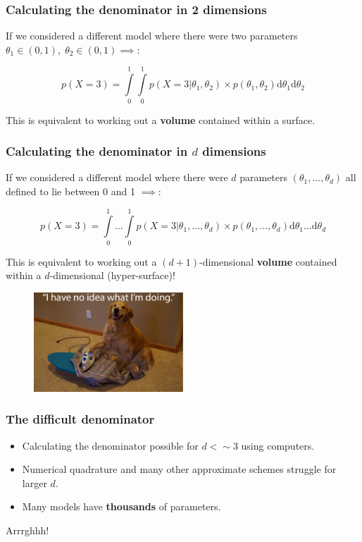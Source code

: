 \documentclass[handout]{beamer}
\begin{document}
\begin{frame}
	\frametitle{Calculating the denominator in 2 dimensions}
	 If we considered a different model where there were two parameters $\theta_1\in(0,1),\; \theta_2\in(0,1)  \implies$:
	
	
	\begin{equation}
	p(X=3) = \int\limits_{0}^{1} \int\limits_{0}^{1} p(X=3|\theta_1,\theta_2)\times p(\theta_1,\theta_2) \mathrm{d}\theta_1 \mathrm{d}\theta_2 
	\end{equation}
	
	 This is equivalent to working out a \textbf{volume} contained within a surface.
	
\end{frame}

\begin{frame}
	\frametitle{Calculating the denominator in $d$ dimensions}
	 If we considered a different model where there were $d$ parameters $(\theta_1,...,\theta_d)$ all defined to lie between 0 and 1 $\implies$:
	
	
	\begin{equation}
	p(X=3) = \int\limits_{0}^{1} ... \int\limits_{0}^{1} p(X=3|\theta_1,...,\theta_d)\times p(\theta_1,...,\theta_d) \mathrm{d}\theta_1...\mathrm{d}\theta_d
	\end{equation}
	
	 This is equivalent to working out a $(d+1)$-dimensional \textbf{volume} contained within a $d$-dimensional (hyper-surface)!
	
	\begin{figure}
		\centerline{\includegraphics[width=0.5\textwidth]{./animations_figures/lec2_dogIroning.pdf}}
	\end{figure}
	
\end{frame}

\begin{frame}
	\frametitle{The difficult denominator}
	
	\begin{itemize}
		\item<2-> Calculating the denominator possible for $d < \sim 3$ using computers.
		\item<3-> Numerical quadrature and many other approximate schemes struggle for larger $d$.
		\item<4-> Many models have \textbf{thousands} of parameters.
	\end{itemize}
	
	\Large Arrrghhh!
	
\end{frame}
\end{document}
